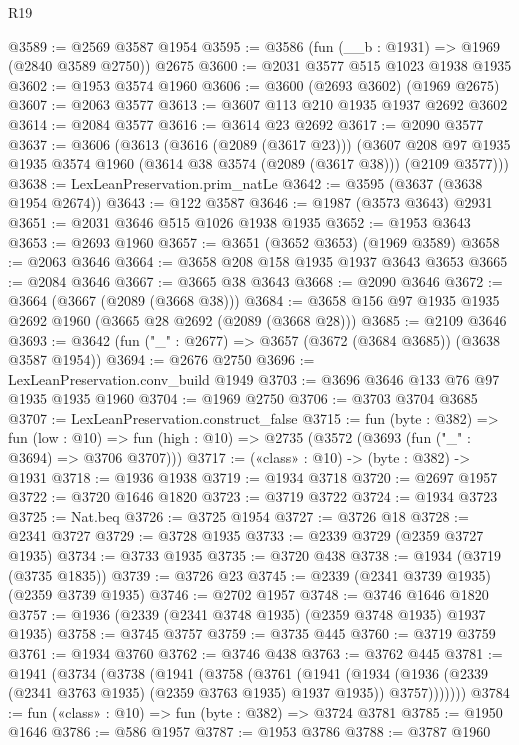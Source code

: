 \begin{lexlean}{R19}
\begin{coremodule}
{{{{{{{{{{{{{{{{{{{{{{{{{{{{{{{{{{{{{{{{{{{{{{{{{{{{{{{{{{{{{{{{{{{{{{{{{{{{{{{{{{{{{{{@3589 := @2569 @3587 @1954
@3595 := @3586 (fun (__b : @1931) => @1969 (@2840 @3589 @2750)) @2675
@3600 := @2031 @3577 @515 @1023 @1938 @1935
@3602 := @1953 @3574 @1960
@3606 := @3600 (@2693 @3602) (@1969 @2675)
@3607 := @2063 @3577
@3613 := @3607 @113 @210 @1935 @1937 @2692 @3602
@3614 := @2084 @3577
@3616 := @3614 @23 @2692
@3617 := @2090 @3577
@3637 := @3606
    (@3613
      (@3616 (@2089 (@3617 @23)))
      (@3607 @208 @97 @1935 @1935 @3574 @1960 (@3614 @38 @3574 (@2089 (@3617 @38))) (@2109 @3577)))
@3638 := LexLeanPreservation.prim_natLe
@3642 := @3595 (@3637 (@3638 @1954 @2674))
@3643 := @122 @3587
@3646 := @1987 (@3573 @3643) @2931
@3651 := @2031 @3646 @515 @1026 @1938 @1935
@3652 := @1953 @3643
@3653 := @2693 @1960
@3657 := @3651 (@3652 @3653) (@1969 @3589)
@3658 := @2063 @3646
@3664 := @3658 @208 @158 @1935 @1937 @3643 @3653
@3665 := @2084 @3646
@3667 := @3665 @38 @3643
@3668 := @2090 @3646
@3672 := @3664 (@3667 (@2089 (@3668 @38)))
@3684 := @3658 @156 @97 @1935 @1935 @2692 @1960 (@3665 @28 @2692 (@2089 (@3668 @28)))
@3685 := @2109 @3646
@3693 := @3642 (fun ("_" : @2677) => @3657 (@3672 (@3684 @3685)) (@3638 @3587 @1954))
@3694 := @2676 @2750
@3696 := LexLeanPreservation.conv_build @1949
@3703 := @3696 @3646 @133 @76 @97 @1935 @1935 @1960
@3704 := @1969 @2750
@3706 := @3703 @3704 @3685
@3707 := LexLeanPreservation.construct_false
@3715 := fun (byte : @382) =>
  fun (low : @10) => fun (high : @10) => @2735 (@3572 (@3693 (fun ("_" : @3694) => @3706 @3707)))
@3717 := («class» : @10) -> (byte : @382) -> @1931
@3718 := @1936 @1938
@3719 := @1934 @3718
@3720 := @2697 @1957
@3722 := @3720 @1646 @1820
@3723 := @3719 @3722
@3724 := @1934 @3723
@3725 := Nat.beq
@3726 := @3725 @1954
@3727 := @3726 @18
@3728 := @2341 @3727
@3729 := @3728 @1935
@3733 := @2339 @3729 (@2359 @3727 @1935)
@3734 := @3733 @1935
@3735 := @3720 @438
@3738 := @1934 (@3719 (@3735 @1835))
@3739 := @3726 @23
@3745 := @2339 (@2341 @3739 @1935) (@2359 @3739 @1935)
@3746 := @2702 @1957
@3748 := @3746 @1646 @1820
@3757 := @1936 (@2339 (@2341 @3748 @1935) (@2359 @3748 @1935) @1937 @1935)
@3758 := @3745 @3757
@3759 := @3735 @445
@3760 := @3719 @3759
@3761 := @1934 @3760
@3762 := @3746 @438
@3763 := @3762 @445
@3781 := @1941
    (@3734
      (@3738
        (@1941
          (@3758
            (@3761
              (@1941
                (@1934
                  (@1936 (@2339 (@2341 @3763 @1935) (@2359 @3763 @1935) @1937 @1935))
                  @3757)))))))
@3784 := fun («class» : @10) => fun (byte : @382) => @3724 @3781
@3785 := @1950 @1646
@3786 := @586 @1957
@3787 := @1953 @3786
@3788 := @3787 @1960
}}}}}}}}}}}}}}}}}}}}}}}}}}}}}}}}}}}}}}}}}}}}}}}}}}}}}}}}}}}}}}}}}}}}}}}}}}}}}}}}}}}}}}}
\end{coremodule}
\end{lexlean}
